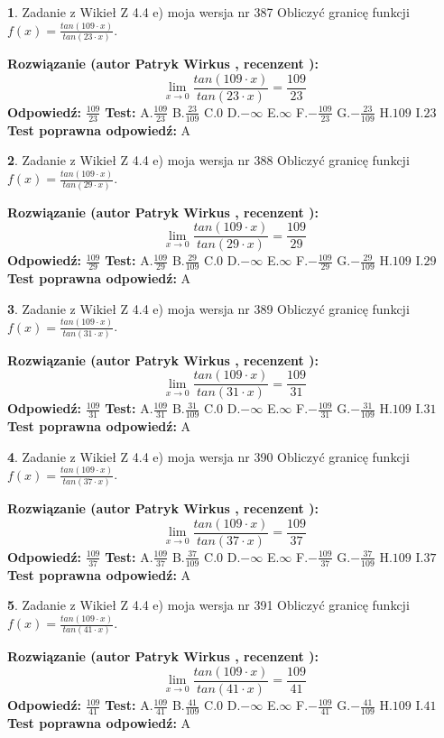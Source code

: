 \documentclass[12pt, a4paper]{article}
\theoremstyle{definition} %
\newtheorem{zad}{}
\newcommand{\zadStart}[1]{\begin{zad}#1\newline}
\newcommand{\zadStop}{\end{zad}}
\newcommand{\rozwStart}[2]{\noindent \textbf{Rozwiązanie (autor #1 , recenzent #2): }\newline}
\newcommand{\rozwStop}{\newline}
\newcommand{\odpStart}{\noindent \textbf{Odpowiedź:}\newline}
\newcommand{\odpStop}{\newline}
\newcommand{\testStart}{\noindent \textbf{Test:}\newline}
\newcommand{\testStop}{\newline}
\newcommand{\kluczStart}{\noindent \textbf{Test poprawna odpowiedź:}\newline}
\newcommand{\kluczStop}{\newline}
\begin{document}
\zadStart{Zadanie z Wikieł Z 4.4 e) moja wersja nr 387}
Obliczyć granicę funkcji $f(x)=\frac{tan(109\cdot x)}{tan(23\cdot x)}$.
\zadStop
\rozwStart{Patryk Wirkus}{}
$$\lim\limits_{x\to 0}\frac{tan(109\cdot x)}{tan(23\cdot x)}=
\frac{109}{23}$$
\rozwStop
\odpStart
$\frac{109}{23}$
\odpStop
\testStart
A.$\frac{109}{23}$
B.$\frac{23}{109}$
C.$0$
D.$-\infty$
E.$\infty$
F.$-\frac{109}{23}$
G.$-\frac{23}{109}$
H.$109$
I.$23$
\testStop
\kluczStart
A
\kluczStop



\zadStart{Zadanie z Wikieł Z 4.4 e) moja wersja nr 388}
Obliczyć granicę funkcji $f(x)=\frac{tan(109\cdot x)}{tan(29\cdot x)}$.
\zadStop
\rozwStart{Patryk Wirkus}{}
$$\lim\limits_{x\to 0}\frac{tan(109\cdot x)}{tan(29\cdot x)}=
\frac{109}{29}$$
\rozwStop
\odpStart
$\frac{109}{29}$
\odpStop
\testStart
A.$\frac{109}{29}$
B.$\frac{29}{109}$
C.$0$
D.$-\infty$
E.$\infty$
F.$-\frac{109}{29}$
G.$-\frac{29}{109}$
H.$109$
I.$29$
\testStop
\kluczStart
A
\kluczStop



\zadStart{Zadanie z Wikieł Z 4.4 e) moja wersja nr 389}
Obliczyć granicę funkcji $f(x)=\frac{tan(109\cdot x)}{tan(31\cdot x)}$.
\zadStop
\rozwStart{Patryk Wirkus}{}
$$\lim\limits_{x\to 0}\frac{tan(109\cdot x)}{tan(31\cdot x)}=
\frac{109}{31}$$
\rozwStop
\odpStart
$\frac{109}{31}$
\odpStop
\testStart
A.$\frac{109}{31}$
B.$\frac{31}{109}$
C.$0$
D.$-\infty$
E.$\infty$
F.$-\frac{109}{31}$
G.$-\frac{31}{109}$
H.$109$
I.$31$
\testStop
\kluczStart
A
\kluczStop



\zadStart{Zadanie z Wikieł Z 4.4 e) moja wersja nr 390}
Obliczyć granicę funkcji $f(x)=\frac{tan(109\cdot x)}{tan(37\cdot x)}$.
\zadStop
\rozwStart{Patryk Wirkus}{}
$$\lim\limits_{x\to 0}\frac{tan(109\cdot x)}{tan(37\cdot x)}=
\frac{109}{37}$$
\rozwStop
\odpStart
$\frac{109}{37}$
\odpStop
\testStart
A.$\frac{109}{37}$
B.$\frac{37}{109}$
C.$0$
D.$-\infty$
E.$\infty$
F.$-\frac{109}{37}$
G.$-\frac{37}{109}$
H.$109$
I.$37$
\testStop
\kluczStart
A
\kluczStop



\zadStart{Zadanie z Wikieł Z 4.4 e) moja wersja nr 391}
Obliczyć granicę funkcji $f(x)=\frac{tan(109\cdot x)}{tan(41\cdot x)}$.
\zadStop
\rozwStart{Patryk Wirkus}{}
$$\lim\limits_{x\to 0}\frac{tan(109\cdot x)}{tan(41\cdot x)}=
\frac{109}{41}$$
\rozwStop
\odpStart
$\frac{109}{41}$
\odpStop
\testStart
A.$\frac{109}{41}$
B.$\frac{41}{109}$
C.$0$
D.$-\infty$
E.$\infty$
F.$-\frac{109}{41}$
G.$-\frac{41}{109}$
H.$109$
I.$41$
\testStop
\kluczStart
A
\kluczStop
\end{document}
